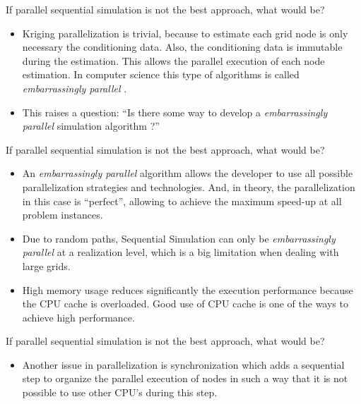 \begin{frame}{If parallel sequential simulation is not the best approach, what would be?}
	\begin {itemize}
		\item Kriging parallelization is trivial, because to estimate each grid node is only necessary the conditioning data. Also, the conditioning data is immutable during the estimation. This allows the parallel execution of each node estimation. In computer science this type of algorithms is called \textit{embarrassingly parallel} \cite{wilkinson1999parallel}.
    
    	\item This raises a question: ``Is there some way to develop a \textit{embarrassingly parallel} simulation algorithm ?''
    \end {itemize}
\end{frame}

\begin{frame}{If parallel sequential simulation is not the best approach, what would be?}
	\begin {itemize}
		\item An \textit{embarrassingly parallel} algorithm allows the developer to use all possible parallelization strategies and technologies. And, in theory, the parallelization in this case is ``perfect'', allowing to achieve the maximum speed-up at all problem instances. 
        \item Due to random paths,  Sequential Simulation   can only be \textit{embarrassingly parallel} at a realization level, which is a big limitation when dealing with large grids.
        \item High memory usage reduces significantly the execution performance because the CPU cache is overloaded. Good use of CPU cache is one of the ways to achieve high performance.
    \end {itemize}
\end{frame}


\begin{frame}{If parallel sequential simulation is not the best approach, what would be?}
	\begin {itemize}
        \item Another issue in parallelization is synchronization which adds a sequential step to organize the parallel execution of nodes in such a way that it is not possible to use other CPU's during this step.
    	
    \end {itemize}
\end{frame}


